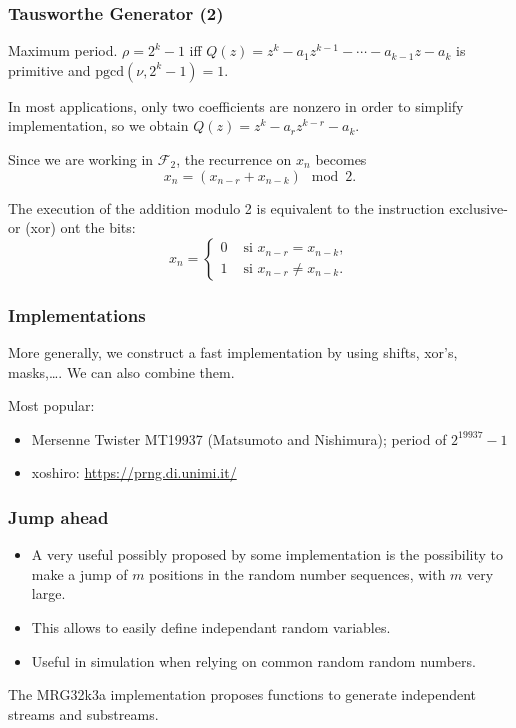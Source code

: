 \documentclass{beamer}
\begin{document}
	\begin{frame}
		\frametitle{Tausworthe Generator (2)}
		
		{\blue Maximum period.} $\rho = 2^k-1$ iff ${Q(z)} = z^k - a_1 z^{k-1}
		- \cdots - a_{k-1} z - a_k$ is primitive and $\mbox{pgcd}(\nu, 2^k-1)
		= 1$.
		
		\mbox{}
		
		In most applications, only two coefficients are nonzero in order to
		simplify implementation, so we obtain ${Q(z)} = z^k - a_r z^{k-r} - a_k$.
		
		\mbox{}
		
		Since we are working in $\mathcal{F}_2$, the recurrence on $x_n$ becomes
		\[
		x_n = (x_{n-r}+x_{n-k}) \mod 2.
		\]
		
		\mbox{}
		
		The execution of the addition modulo 2 is equivalent to the
		instruction exclusive-or (xor) ont the bits:
		\[
		x_n =
		\begin{cases}
			0 & \mbox{ si } x_{n-r} = x_{n-k},\\
			1 & \mbox{ si } x_{n-r} \ne x_{n-k}.
		\end{cases}
		\]
		
	\end{frame}
	
	\begin{frame}
		\frametitle{Implementations}
		
		More generally, we construct a fast implementation by using shifts,
		xor's, masks,\ldots. We can also combine them.
		
		\mbox{}
		
Most popular:
\begin{itemize}
	\item 
	Mersenne Twister MT19937 (Matsumoto and Nishimura); period of $2^{19937}-1$
	\item
	xoshiro: \url{https://prng.di.unimi.it/}
\end{itemize}

		
	\end{frame}

\begin{frame}
\frametitle{Jump ahead}

\begin{itemize}
	\item 
A very useful possibly proposed by some implementation is the possibility to make a jump of $m$ positions in the random number sequences, with $m$ very large.
\item
This allows to easily define independant random variables.
\item
Useful in simulation when relying on common random random numbers.
\end{itemize}

The MRG32k3a implementation proposes functions to generate independent streams and substreams.

\end{frame}
\end{document}
